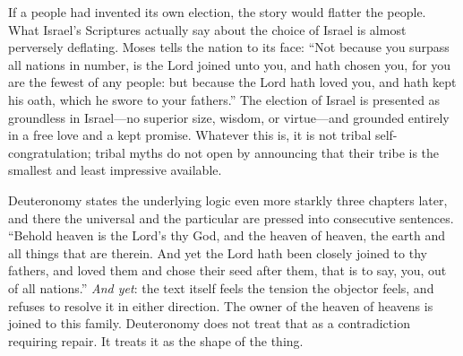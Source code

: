 If a people had invented its own election, the story would flatter the people. What Israel's Scriptures actually say about the choice of Israel is almost perversely deflating. Moses tells the nation to its face: ``Not because you surpass all nations in number, is the Lord joined unto you, and hath chosen you, for you are the fewest of any people: but because the Lord hath loved you, and hath kept his oath, which he swore to your fathers.'' The election of Israel is presented as groundless in Israel---no superior size, wisdom, or virtue---and grounded entirely in a free love and a kept promise. Whatever this is, it is not tribal self-congratulation; tribal myths do not open by announcing that their tribe is the smallest and least impressive available.

Deuteronomy states the underlying logic even more starkly three chapters later, and there the universal and the particular are pressed into consecutive sentences. ``Behold heaven is the Lord's thy God, and the heaven of heaven, the earth and all things that are therein. And yet the Lord hath been closely joined to thy fathers, and loved them and chose their seed after them, that is to say, you, out of all nations.'' \emph{And yet}: the text itself feels the tension the objector feels, and refuses to resolve it in either direction. The owner of the heaven of heavens is joined to this family. Deuteronomy does not treat that as a contradiction requiring repair. It treats it as the shape of the thing.


